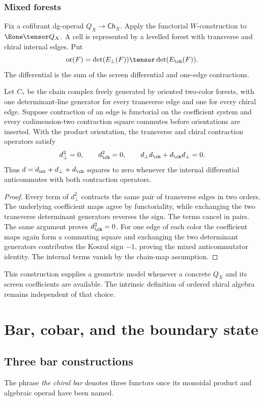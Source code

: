\section{Mixed forests}
Fix a cofibrant dg-operad $Q_X\to\mathsf{Ch}_X$. Apply the functorial $W$-construction to $\Eone\tensor Q_X$. A cell is represented by a levelled forest with transverse and chiral internal edges. Put
\[
 \operatorname{or}(F)=\det(E_\perp(F))\tensor\det(E_{\ch}(F)).
\]
The differential is the sum of the screen differential and one-edge contractions.

\begin{theorem}
Let $C_*$ be the chain complex freely generated by oriented two-color forests, with one determinant-line generator for every transverse edge and one for every chiral edge.  Suppose contraction of an edge is functorial on the coefficient system and every codimension-two contraction square commutes before orientations are inserted.  With the product orientation, the transverse and chiral contraction operators satisfy
\[
 d_\perp^2=0,\qquad d_{\ch}^2=0,\qquad
 d_\perp d_{\ch}+d_{\ch}d_\perp=0.
\]
Thus $d=d_{\mathrm{int}}+d_\perp+d_{\ch}$ squares to zero whenever the internal differential anticommutes with both contraction operators.
\end{theorem}
\begin{proof}
Every term of $d_\perp^2$ contracts the same pair of transverse edges in two orders.  The underlying coefficient maps agree by functoriality, while exchanging the two transverse determinant generators reverses the sign.  The terms cancel in pairs.  The same argument proves $d_{\ch}^2=0$.  For one edge of each color the coefficient maps again form a commuting square and exchanging the two determinant generators contributes the Koszul sign $-1$, proving the mixed anticommutator identity.  The internal terms vanish by the chain-map assumption.
\end{proof}

This construction supplies a geometric model whenever a concrete $Q_X$ and its screen coefficients are available. The intrinsic definition of ordered chiral algebra remains independent of that choice.

\part{Bar, cobar, and the boundary state}


\chapter{Three bar constructions}
The phrase \emph{the chiral bar} denotes three functors once its monoidal product and algebraic operad have been named.

